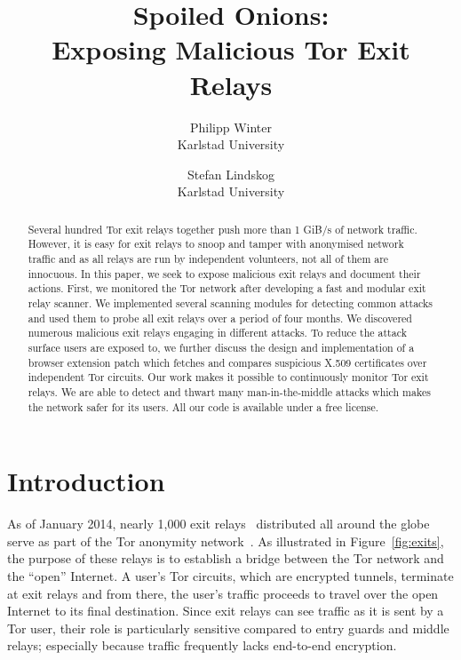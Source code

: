 \documentclass[letterpaper,twocolumn,10pt]{article}
\begin{document}
\title{
	\Large \bf
	Spoiled Onions:\\Exposing Malicious Tor Exit Relays}

\author{
	{\rm Philipp Winter} \\
	Karlstad University
	\and
	{\rm Stefan Lindskog} \\
	Karlstad University
}

\maketitle


\begin{abstract}
Several hundred Tor exit relays together push more than 1 GiB/s of network traffic.  However, it is
easy for exit relays to snoop and tamper with anonymised network traffic and as all relays are run
by independent volunteers, not all of them are innocuous.
In this paper, we seek to expose malicious exit relays and document their actions.  First, we
monitored the Tor network after developing a fast and modular exit relay scanner.  We implemented
several scanning modules for detecting common attacks and used them to probe all exit relays over a
period of four months.  We discovered numerous malicious exit relays engaging in different attacks.
To reduce the attack surface users are exposed to, we further discuss the design and implementation
of a browser extension patch which fetches and compares suspicious X.509 certificates over
independent Tor circuits.
Our work makes it possible to continuously monitor Tor exit relays.  We are able to detect and
thwart many man-in-the-middle attacks which makes the network safer for its users.  All our code is
available under a free license.
\end{abstract}

\section{Introduction}


As of January 2014, nearly 1,000 exit relays~\cite{metrics} distributed all around the globe serve
as part of the Tor anonymity network~\cite{Dingledine2004}.  As illustrated in
Figure~\ref{fig:exits}, the purpose of these relays is to establish a bridge between the Tor network
and the ``open'' Internet.  A user's Tor circuits, which are encrypted tunnels, terminate at exit
relays and from there, the user's traffic proceeds to travel over the open Internet to its final
destination.  Since exit relays can see traffic as it is sent by a Tor user, their role is
particularly sensitive compared to entry guards and middle relays; especially because traffic
frequently lacks end-to-end encryption.
\end{document}
